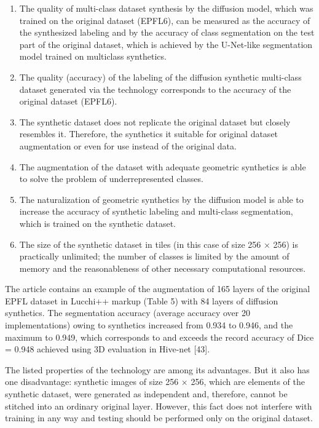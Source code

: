 \documentclass[journal,article,submit,pdftex,moreauthors]{Definitions/mdpi}
\begin{document}
\begin{enumerate}
	\item {The quality of multi-class dataset synthesis by the diffusion model, which was trained on the original dataset (EPFL6), can be measured as the accuracy of the synthesized labeling and by the accuracy of class segmentation on the test part of the original dataset, which is achieved by the U-Net-like segmentation model trained on multiclass synthetics.}
	\item {The quality (accuracy) of the labeling of the diffusion synthetic multi-class dataset generated via the technology corresponds to the accuracy of the original dataset (EPFL6).}
	\item {The synthetic dataset does not replicate the original dataset but closely resembles it. Therefore, the synthetics it suitable for original dataset augmentation or even for use instead of the original data.}
	\item {The augmentation of the dataset with adequate geometric synthetics is able to solve the problem of underrepresented classes.}
	\item {The naturalization of geometric synthetics by the diffusion model is able to increase the accuracy of synthetic labeling and multi-class segmentation, which is trained on the synthetic dataset.}
	\item {The size of the synthetic dataset in tiles (in this case of size 256 × 256) is practically unlimited; the number of classes is limited by the amount of memory and the reasonableness of other necessary computational resources.}
\end{enumerate}

The article contains an example of the augmentation of 165 layers of the original EPFL dataset in Lucchi++ markup (Table 5) with 84 layers of diffusion synthetics. The segmentation accuracy (average accuracy over 20 implementations) owing to synthetics increased from 0.934 to 0.946, and the maximum to 0.949, which corresponds to and exceeds the record accuracy of Dice = 0.948 achieved using 3D evaluation in Hive-net [43].

The listed properties of the technology are among its advantages. But it also has one disadvantage: synthetic images of size 256 × 256, which are elements of the synthetic dataset, were generated as independent and, therefore, cannot be stitched into an ordinary original layer. However, this fact does not interfere with training in any way and testing should be performed only on the original dataset.
\end{document}
